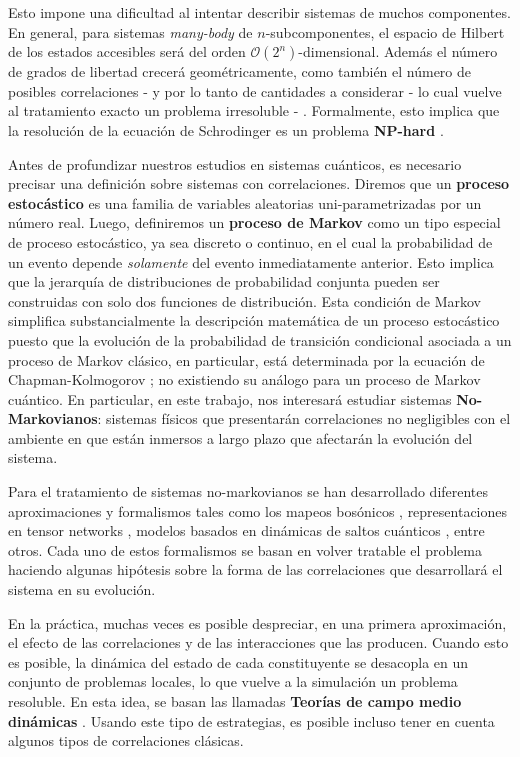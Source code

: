 \documentclass{report} %
\numberwithin{equation}{section}
\begin{document}
Esto impone una dificultad al intentar describir sistemas de muchos componentes.
En general, para sistemas \textit{many-body} de $n$-subcomponentes, el espacio de Hilbert de los estados accesibles será del orden $\mathcal{O}(2^n)$-dimensional. Además el número de grados de libertad crecerá geométricamente, como también el número de posibles correlaciones - y por lo tanto de  cantidades a considerar - lo cual vuelve al tratamiento exacto un problema irresoluble - . Formalmente, esto implica que la resolución de la ecuación de Schrodinger es un problema \textbf{NP-hard} \cite{bolotin2013computational, bolotin2014computational}.

Antes de profundizar nuestros estudios en sistemas cuánticos, es necesario precisar una definición sobre sistemas con correlaciones. Diremos que un \textbf{proceso estocástico} \cite{HeinzPetruccione} es una familia de variables aleatorias uni-parametrizadas 
por un número real. Luego, definiremos un \textbf{proceso de Markov} \cite{HeinzPetruccione} como un tipo especial de proceso estocástico, ya sea discreto o continuo, en el cual la probabilidad de un evento depende \textit{solamente} del evento inmediatamente anterior. Esto implica que la jerarquía de distribuciones de probabilidad conjunta pueden ser construidas con solo dos funciones de distribución. Esta condición de Markov simplifica substancialmente la descripción matemática de un proceso estocástico puesto que la evolución de la probabilidad de transición condicional asociada a un proceso de Markov clásico, en particular, está determinada por la ecuación de Chapman-Kolmogorov \cite{HeinzPetruccione, Dynkin89}; no existiendo su análogo para un proceso de Markov cuántico. En particular, en este trabajo, nos interesará estudiar sistemas \textbf{No-Markovianos}: sistemas físicos que presentarán correlaciones no negligibles con el ambiente en que están inmersos a largo plazo que afectarán la evolución del sistema. 

Para el tratamiento de sistemas no-markovianos se han desarrollado diferentes aproximaciones y formalismos tales como los mapeos bosónicos \cite{huber2020phase}, representaciones en tensor networks \cite{HOPS,TEDOPA,DAMPF}, modelos basados en dinámicas de saltos cuánticos \cite{Plenio1998,Pilo2008}, entre otros. Cada uno de estos formalismos se basan en volver tratable el problema haciendo algunas hipótesis sobre la forma de las correlaciones que desarrollará el sistema en su evolución. 

En la práctica, muchas veces es posible despreciar, en una primera aproximación, el efecto de las correlaciones y de las interacciones que las producen. Cuando esto es posible, la dinámica del estado de cada constituyente se desacopla en un conjunto de problemas locales, lo que vuelve a la simulación un problema resoluble. En esta idea, se basan las llamadas \textbf{Teorías de campo medio dinámicas} \cite{GKW1996}. Usando este tipo de estrategias, es posible incluso tener en cuenta algunos tipos de correlaciones clásicas\cite{CMR.07}. 
\end{document}
